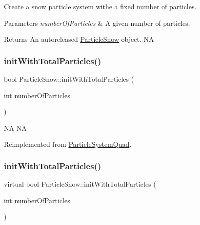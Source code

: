 Create a snow particle system withe a fixed number of particles.


\begin{DoxyParams}{Parameters}
{\em number\+Of\+Particles} & A given number of particles. \\
\hline
\end{DoxyParams}
\begin{DoxyReturn}{Returns}
An autoreleased \hyperlink{classParticleSnow}{Particle\+Snow} object.  NA 
\end{DoxyReturn}
\mbox{\label{classParticleSnow_ab6621eb3a4940edf86739df88fc63308}} 
\subsubsection{\texorpdfstring{init\+With\+Total\+Particles()}{initWithTotalParticles()}\hspace{0.1cm}{\footnotesize\ttfamily [1/2]}}
{\footnotesize\ttfamily bool Particle\+Snow\+::init\+With\+Total\+Particles (\begin{DoxyParamCaption}\item[{int}]{number\+Of\+Particles }\end{DoxyParamCaption})\hspace{0.3cm}{\ttfamily [virtual]}}

NA  NA 

Reimplemented from \hyperlink{classParticleSystemQuad_ae5420007b57e909c05e7476a54fbfbe9}{Particle\+System\+Quad}.

\mbox{\label{classParticleSnow_a298dd9a158e39d502732998c55e86528}} 
\subsubsection{\texorpdfstring{init\+With\+Total\+Particles()}{initWithTotalParticles()}\hspace{0.1cm}{\footnotesize\ttfamily [2/2]}}
{\footnotesize\ttfamily virtual bool Particle\+Snow\+::init\+With\+Total\+Particles (\begin{DoxyParamCaption}\item[{int}]{number\+Of\+Particles }\end{DoxyParamCaption})\hspace{0.3cm}{\ttfamily [virtual]}}

